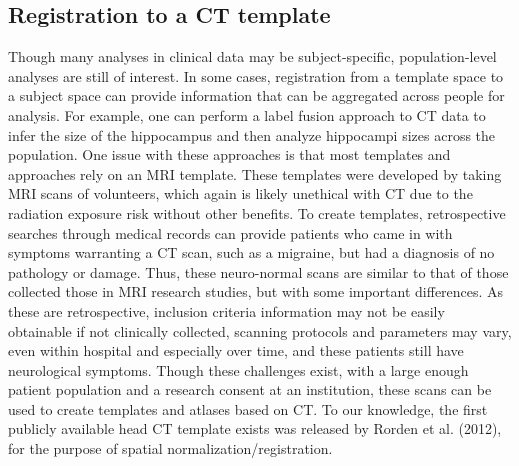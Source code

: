 \documentclass[]{elsarticle} %
\begin{document}
\hypertarget{registration-to-a-ct-template}{%
\subsection{Registration to a CT template}\label{registration-to-a-ct-template}}

Though many analyses in clinical data may be subject-specific, population-level analyses are still of interest. In some cases, registration from a template space to a subject space can provide information that can be aggregated across people for analysis. For example, one can perform a label fusion approach to CT data to infer the size of the hippocampus and then analyze hippocampi sizes across the population. One issue with these approaches is that most templates and approaches rely on an MRI template. These templates were developed by taking MRI scans of volunteers, which again is likely unethical with CT due to the radiation exposure risk without other benefits. To create templates, retrospective searches through medical records can provide patients who came in with symptoms warranting a CT scan, such as a migraine, but had a diagnosis of no pathology or damage. Thus, these neuro-normal scans are similar to that of those collected those in MRI research studies, but with some important differences. As these are retrospective, inclusion criteria information may not be easily obtainable if not clinically collected, scanning protocols and parameters may vary, even within hospital and especially over time, and these patients still have neurological symptoms. Though these challenges exist, with a large enough patient population and a research consent at an institution, these scans can be used to create templates and atlases based on CT. To our knowledge, the first publicly available head CT template exists was released by Rorden et al. (2012), for the purpose of spatial normalization/registration.
\end{document}
